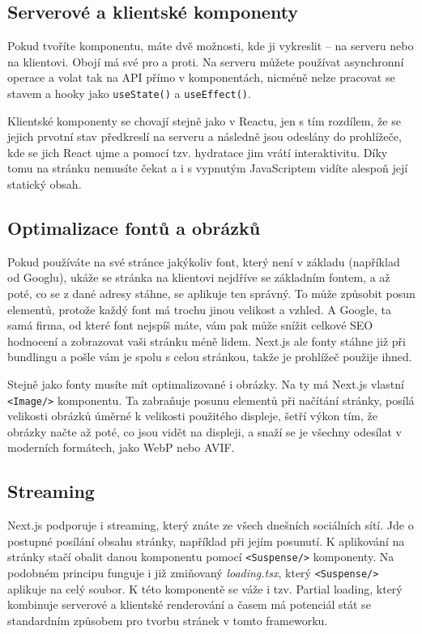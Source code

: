 \subsection*{Serverové a klientské komponenty}

Pokud tvoříte komponentu, máte dvě možnosti, kde ji vykreslit\cite{NextJSS&CComponents} – na serveru\cite{NextJSServerComponents} nebo na klientovi\cite{NextJSClientComponents}. Obojí má své pro a proti. Na serveru můžete používat asynchronní operace a volat tak na API přímo v komponentách, nicméně nelze pracovat se stavem a hooky jako \texttt{useState()} a \texttt{useEffect()}.

Klientské komponenty se chovají stejně jako v Reactu, jen s tím rozdílem, že se jejich prvotní stav předkreslí na serveru a následně jsou odeslány do prohlížeče, kde se jich React ujme a pomocí tzv. hydratace jim vrátí interaktivitu. Díky tomu na stránku nemusíte čekat a i s vypnutým JavaScriptem vidíte alespoň její statický obsah.\cite{NextHydration}

\subsection*{Optimalizace fontů a obrázků}

Pokud používáte na své stránce jakýkoliv font, který není v základu (například od Googlu), ukáže se stránka na klientovi nejdříve se základním fontem, a až poté, co se z dané adresy stáhne, se aplikuje ten správný. To může způsobit posun elementů, protože každý font má trochu jinou velikost a vzhled. A Google, ta samá firma, od které font nejspíš máte, vám pak může snížit celkové SEO hodnocení a zobrazovat vaši stránku méně lidem. Next.js ale fonty stáhne již při bundlingu a pošle vám je spolu s celou stránkou, takže je prohlížeč použije ihned.

Stejně jako fonty musíte mít optimalizované i obrázky. Na ty má Next.js vlastní \texttt{<Image/>} komponentu. Ta zabraňuje posunu elementů při načítání stránky, posílá velikosti obrázků úměrné k velikosti použitého displeje, šetří výkon tím, že obrázky načte až poté, co jsou vidět na displeji, a snaží se je všechny odesílat v moderních formátech, jako WebP nebo AVIF.

\subsection*{Streaming}

Next.js podporuje i streaming, který znáte ze všech dnešních sociálních sítí. Jde o postupné posílání obsahu stránky, například při jejím posunutí. K aplikování na stránky stačí obalit danou komponentu pomocí \texttt{<Suspense/>} komponenty. Na podobném principu funguje i již zmiňovaný \textit{loading.tsx}, který \texttt{<Suspense/>} aplikuje na celý soubor. K této komponentě se váže i tzv. Partial loading, který kombinuje serverové a klientské renderování a časem má potenciál stát se standardním způsobem pro tvorbu stránek v tomto frameworku.

